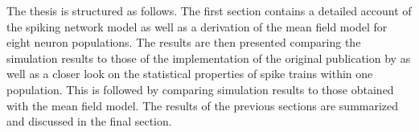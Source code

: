 The thesis is structured as follows. The first section contains a detailed account 
of the spiking network model as well as a derivation of the mean field model 
for eight neuron populations.  
The results are then presented comparing the simulation results to 
those of the implementation of the original publication by 
 as well as a closer look on the statistical properties 
of spike trains within one population. 
This is followed by comparing simulation results to those
obtained with the mean field model. 
The results of the previous sections are summarized and discussed in the final section. 



